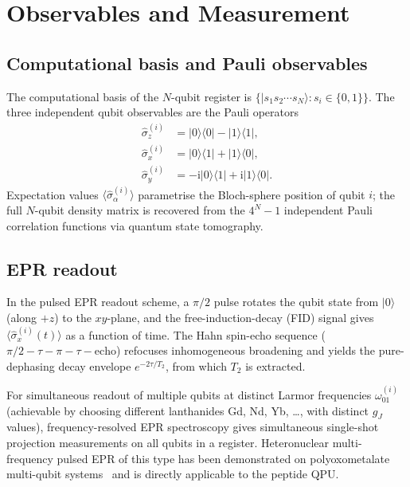 \documentclass[11pt,oneside]{amsbook}
\numberwithin{equation}{section}
\theoremstyle{plain}
\theoremstyle{definition}
\theoremstyle{remark}
\begin{document}
\section{Observables and Measurement}
\label{sec:pqpu_observables}

\subsection{Computational basis and Pauli observables}
\label{subsec:pqpu_Pauli}

The computational basis of the $N$-qubit register is
$\{|s_1 s_2 \cdots s_N\rangle : s_i \in \{0, 1\}\}$.  The three independent
qubit observables are the Pauli operators
\begin{align}
  \hat{\sigma}_z^{(i)} &= |0\rangle\langle 0| - |1\rangle\langle 1|,\label{eq:Pauli_z}\\
  \hat{\sigma}_x^{(i)} &= |0\rangle\langle 1| + |1\rangle\langle 0|,\label{eq:Pauli_x}\\
  \hat{\sigma}_y^{(i)} &= -\mathrm{i}|0\rangle\langle 1| + \mathrm{i}|1\rangle\langle 0|.\label{eq:Pauli_y}
\end{align}
Expectation values $\langle\hat\sigma_\alpha^{(i)}\rangle$ parametrise the
Bloch-sphere position of qubit $i$; the full $N$-qubit density matrix is
recovered from the $4^N - 1$ independent Pauli correlation functions via
quantum state tomography.

\subsection{EPR readout}
\label{subsec:pqpu_EPR_readout}

In the pulsed EPR readout scheme, a $\pi/2$ pulse rotates the qubit state from
$|0\rangle$ (along $+z$) to the $xy$-plane, and the free-induction-decay (FID)
signal gives $\langle\hat\sigma_x^{(i)}(t)\rangle$ as a function of time.
The Hahn spin-echo sequence ($\pi/2 - \tau - \pi - \tau - \text{echo}$)
refocuses inhomogeneous broadening and yields the pure-dephasing decay
envelope $e^{-2\tau/T_2}$, from which $T_2$ is extracted.

For simultaneous readout of multiple qubits at distinct Larmor frequencies
$\omega_{01}^{(i)}$ (achievable by choosing different lanthanides Gd, Nd, Yb,
\ldots, with distinct $g_J$ values), frequency-resolved EPR spectroscopy gives
simultaneous single-shot projection measurements on all qubits in a register.
Heteronuclear multi-frequency pulsed EPR of this type has been demonstrated on
polyoxometalate multi-qubit systems~\cite{BaldoviEtAl2013} and is directly
applicable to the peptide QPU.
\end{document}
